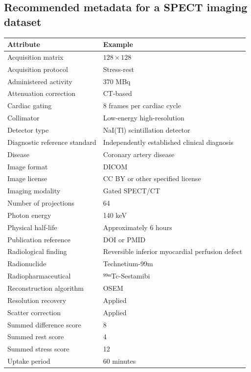 \subsection{Recommended metadata for a SPECT imaging dataset}
\begin{longtable}{@{}p{}p{}@{}}
\toprule
\textbf{Attribute} & \textbf{Example} \\
\midrule
Acquisition matrix & $128 \times 128$ \\
Acquisition protocol & Stress-rest \\
Administered activity & 370 MBq \\
Attenuation correction & CT-based \\
Cardiac gating & 8 frames per cardiac cycle \\
Collimator & Low-energy high-resolution \\
Detector type & NaI(Tl) scintillation detector \\
Diagnostic reference standard & Independently established clinical diagnosis \\
Disease & Coronary artery disease \\
Image format & DICOM \\
Image license & CC BY or other specified license \\
Imaging modality & Gated SPECT/CT \\
Number of projections & 64 \\
Photon energy & 140 keV \\
Physical half-life & Approximately 6 hours \\
Publication reference & DOI or PMID \\
Radiological finding & Reversible inferior myocardial perfusion defect \\
Radionuclide & Technetium-99m \\
Radiopharmaceutical & ⁹⁹ᵐTc-Sestamibi \\
Reconstruction algorithm & OSEM \\
Resolution recovery & Applied \\
Scatter correction & Applied \\
Summed difference score & 8 \\
Summed rest score & 4 \\
Summed stress score & 12 \\
Uptake period & 60 minutes \\
\bottomrule
\end{longtable}

